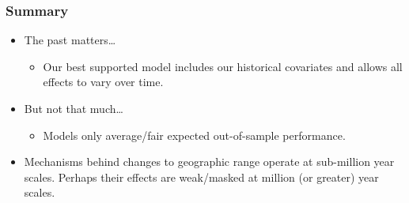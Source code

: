 \documentclass{beamer}
\begin{document}
\begin{frame}
  \frametitle{Summary}

  \begin{itemize}
    \item \alert{The past matters\dots} 
      \begin{itemize}
        \item Our best supported model includes our historical covariates and allows all effects to vary over time.
      \end{itemize}
    \item \alert{But not that much\dots}
      \begin{itemize}
        \item Models only average/fair expected out-of-sample performance.
      \end{itemize}
    \item Mechanisms behind changes to geographic range operate at sub-million year scales. Perhaps their effects are weak/masked at million (or greater) year scales.
  \end{itemize}

\end{frame}
\end{document}
